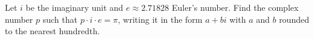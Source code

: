 Let $i$ be the imaginary unit and $e\approx2.71828$ Euler's number. Find the complex number $p$ such that $p\cdot i\cdot e=\pi$, writing it in the form $a+bi$ with $a$ and $b$ rounded to the nearest hundredth.
